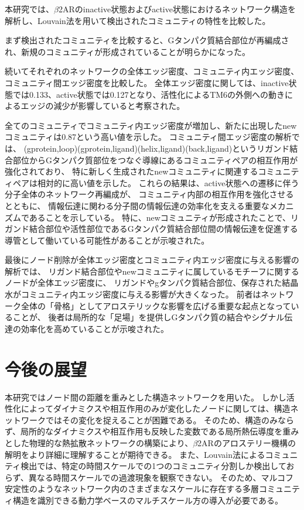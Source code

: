 本研究では、$\beta$2ARのinactive状態およびactive状態におけるネットワーク構造を解析し、Louvain法を用いて検出されたコミュニティの特性を比較した。


まず検出されたコミュニティを比較すると、Gタンパク質結合部位が再編成され、新規のコミュニティが形成されていることが明らかになった。


続いてそれぞれのネットワークの全体エッジ密度、コミュニティ内エッジ密度、コミュニティ間エッジ密度を比較した。
全体エッジ密度に関しては、inactive状態では0.133、active状態では0.127となり、活性化によるTM6の外側への動きによるエッジの減少が影響していると考察された。


全てのコミュニティでコミュニティ内エッジ密度が増加し、新たに出現したnewコミュニティは0.87という高い値を示した。
コミュニティ間エッジ密度の解析では、
(gprotein,loop)(gprotein,ligand)(helix,ligand)(back,ligand)というリガンド結合部位からGタンパク質部位をつなぐ導線にあるコミュニティペアの相互作用が強化されており、
特に新しく生成されたnewコミュニティに関連するコミュニティペアは相対的に高い値を示した。
これらの結果は、active状態への遷移に伴う分子全体のネットワーク再編成が、
コミュニティ内部の相互作用を強化させるとともに、
情報伝達に関わる分子間の情報伝達の効率化を支える重要なメカニズムであることを示している。
特に、newコミュニティが形成されたことで、リガンド結合部位や活性部位であるGタンパク質結合部位間の情報伝達を促進する導管として働いている可能性があることが示唆された。


最後にノード削除が全体エッジ密度とコミュニティ内エッジ密度に与える影響の解析では、
リガンド結合部位やnewコミュニティに属しているモチーフに関するノードが全体エッジ密度に、
リガンドやgタンパク質結合部位、保存された結晶水がコミュニティ内エッジ密度に与える影響が大きくなった。
前者はネットワーク全体の「骨格」としてアロステリックな影響を広げる重要な起点となっていることが、
後者は局所的な「足場」を提供しGタンパク質の結合やシグナル伝達の効率化を高めていることが示唆された。

\section{今後の展望}
本研究ではノード間の距離を重みとした構造ネットワークを用いた。
しかし活性化によってダイナミクスや相互作用のみが変化したノードに関しては、構造ネットワークではその変化を捉えることが困難である。
そのため、構造のみならず、局所的なダイナミクスや相互作用も反映した変数である局所熱伝導度\cite{yamato2022computational}を重みとした物理的な熱拡散ネットワークの構築により、$\beta$2ARのアロステリー機構の解明をより詳細に理解することが期待できる。
また、Louvain法によるコミュニティ検出では、特定の時間スケールでの1つのコミュニティ分割しか検出しておらず、異なる時間スケールでの過渡現象を観察できない。
そのため、マルコフ安定性\cite{amor2014uncovering}のようなネットワーク内のさまざまなスケールに存在する多層コミュニティ構造を識別できる動力学ベースのマルチスケール方の導入が必要である。
